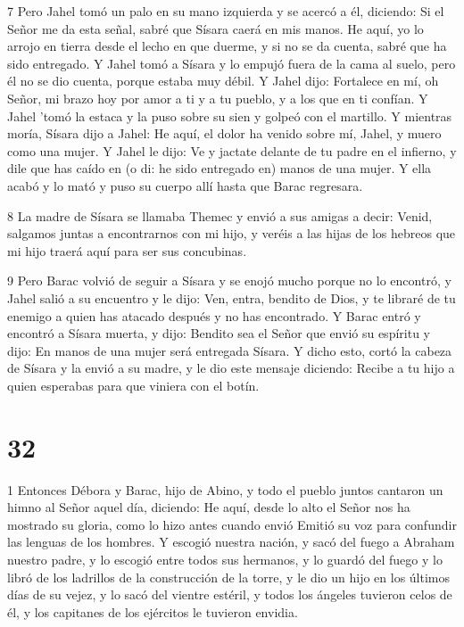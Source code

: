 \par 7 Pero Jahel tomó un palo en su mano izquierda y se acercó a él, diciendo: Si el Señor me da esta señal, sabré que Sísara caerá en mis manos. He aquí, yo lo arrojo en tierra desde el lecho en que duerme, y si no se da cuenta, sabré que ha sido entregado. Y Jahel tomó a Sísara y lo empujó fuera de la cama al suelo, pero él no se dio cuenta, porque estaba muy débil. Y Jahel dijo: Fortalece en mí, oh Señor, mi brazo hoy por amor a ti y a tu pueblo, y a los que en ti confían. Y Jahel 'tomó la estaca y la puso sobre su sien y golpeó con el martillo. Y mientras moría, Sísara dijo a Jahel: He aquí, el dolor ha venido sobre mí, Jahel, y muero como una mujer. Y Jahel le dijo: Ve y jactate delante de tu padre en el infierno, y dile que has caído en (o di: he sido entregado en) manos de una mujer. Y ella acabó y lo mató y puso su cuerpo allí hasta que Barac regresara.

\par 8 La madre de Sísara se llamaba Themec y envió a sus amigas a decir: Venid, salgamos juntas a encontrarnos con mi hijo, y veréis a las hijas de los hebreos que mi hijo traerá aquí para ser sus concubinas.

\par 9 Pero Barac volvió de seguir a Sísara y se enojó mucho porque no lo encontró, y Jahel salió a su encuentro y le dijo: Ven, entra, bendito de Dios, y te libraré de tu enemigo a quien has atacado después y no has encontrado. Y Barac entró y encontró a Sísara muerta, y dijo: Bendito sea el Señor que envió su espíritu y dijo: En manos de una mujer será entregada Sísara. Y dicho esto, cortó la cabeza de Sísara y la envió a su madre, y le dio este mensaje diciendo: Recibe a tu hijo a quien esperabas para que viniera con el botín.



\chapter{32}

\par 1 Entonces Débora y Barac, hijo de Abino, y todo el pueblo juntos cantaron un himno al Señor aquel día, diciendo: He aquí, desde lo alto el Señor nos ha mostrado su gloria, como lo hizo antes cuando envió Emitió su voz para confundir las lenguas de los hombres. Y escogió nuestra nación, y sacó del fuego a Abraham nuestro padre, y lo escogió entre todos sus hermanos, y lo guardó del fuego y lo libró de los ladrillos de la construcción de la torre, y le dio un hijo en los últimos días de su vejez, y lo sacó del vientre estéril, y todos los ángeles tuvieron celos de él, y los capitanes de los ejércitos le tuvieron envidia.

